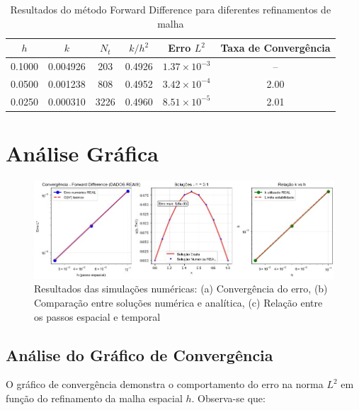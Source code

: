 \documentclass[a4paper, 12pt]{article}
\begin{document}
    \begin{table}[H]
        \centering
        \caption{Resultados do método Forward Difference para diferentes refinamentos de malha}
        \label{tab:convergencia}
        \begin{tabular}{cccccc}
            \toprule
            $h$    & $k$      & $N_t$ & $k/h^2$ & Erro $L^2$            & Taxa de Convergência \\
            \midrule
            0.1000 & 0.004926 & 203   & 0.4926  & $1.37 \times 10^{-3}$ & --                   \\
            0.0500 & 0.001238 & 808   & 0.4952  & $3.42 \times 10^{-4}$ & 2.00                 \\
            0.0250 & 0.000310 & 3226  & 0.4960  & $8.51 \times 10^{-5}$ & 2.01                 \\
            \bottomrule
        \end{tabular}
    \end{table}


    \section{Análise Gráfica}

    \begin{figure}[H]
        \centering
        \includegraphics[width=\textwidth]{imgs/graficos_dados_reais}
        \caption{Resultados das simulações numéricas: (a) Convergência do erro, (b) Comparação entre soluções numérica e analítica, (c) Relação entre os passos espacial e temporal}
        \label{fig:resultados}
    \end{figure}

    \subsection{Análise do Gráfico de Convergência}

    O gráfico de convergência demonstra o comportamento do erro na norma $L^2$ em função do refinamento da malha espacial $h$. Observa-se que:
\end{document}
